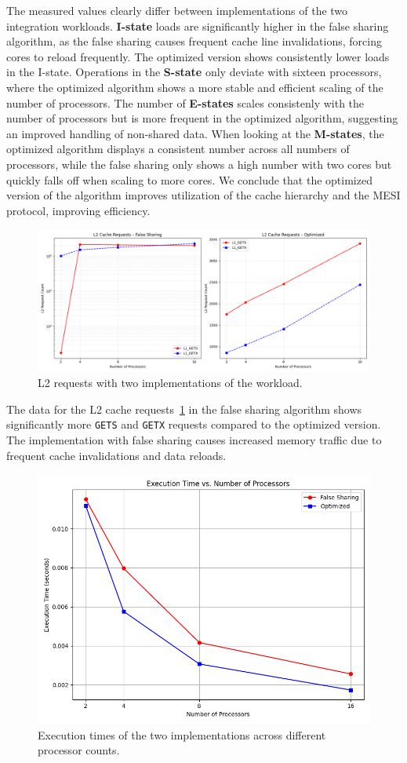 \documentclass[10pt]{article}
\begin{document}
The measured values clearly differ between implementations of the two integration workloads. \textbf{I-state} loads are significantly higher in the false sharing algorithm, as the false sharing causes frequent cache line invalidations, forcing cores to reload frequently. The optimized version shows consistently lower loads in the I-state. Operations in the \textbf{S-state} only deviate with sixteen processors, where the optimized algorithm shows a more stable and efficient scaling of the number of processors. The number of \textbf{E-states} scales consistenly with the number of processors but is more frequent in the optimized algorithm, suggesting an improved handling of non-shared data. When looking at the \textbf{M-states}, the optimized algorithm displays a consistent number across all numbers of processors, while the false sharing only shows a high number with two cores but quickly falls off when scaling to more cores. We conclude that the optimized version of the algorithm improves utilization of the cache hierarchy and the MESI protocol, improving efficiency.

\begin{figure}[hbtp]
    \centering
    \includegraphics[width=0.82\linewidth]{images/task2/l2_requests_plot.png}
    \caption{L2 requests with two implementations of the workload.}
    \label{fig:task2:l2_requests}
\end{figure}

The data for the L2 cache requests~\ref{fig:task2:l2_requests} in the false sharing algorithm shows significantly more \texttt{GETS} and \texttt{GETX} requests compared to the optimized version. The implementation with false sharing causes increased memory traffic due to frequent cache invalidations and data reloads.

\begin{figure}[hbtp]%
    \centering
    \includegraphics[width=0.4\linewidth]{images/task2/execution_times_plot.png}
    \caption{Execution times of the two implementations across different processor counts.}
    \label{fig:task2:exec_time}
\end{figure}
\end{document}
